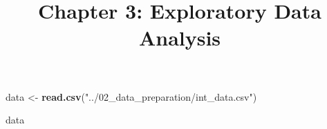 \documentclass[
]{article}
\title{Chapter 3: Exploratory Data Analysis}
\author{}
\date{\vspace{-2.5em}}
\newenvironment{Shaded}{\begin{snugshade}}{\end{snugshade}}
\newcommand{\FunctionTok}[1]{\textcolor[rgb]{0.13,0.29,0.53}{\textbf{#1}}}
\newcommand{\NormalTok}[1]{#1}
\newcommand{\OtherTok}[1]{\textcolor[rgb]{0.56,0.35,0.01}{#1}}
\newcommand{\StringTok}[1]{\textcolor[rgb]{0.31,0.60,0.02}{#1}}
\begin{document}
\maketitle

\begin{Shaded}
\begin{Highlighting}[]
\NormalTok{data }\OtherTok{\textless{}{-}} \FunctionTok{read.csv}\NormalTok{(}\StringTok{"../02\_data\_preparation/int\_data.csv"}\NormalTok{)}
\end{Highlighting}
\end{Shaded}

\begin{Shaded}
\begin{Highlighting}[]
\NormalTok{data}
\end{Highlighting}
\end{Shaded}
\end{document}
